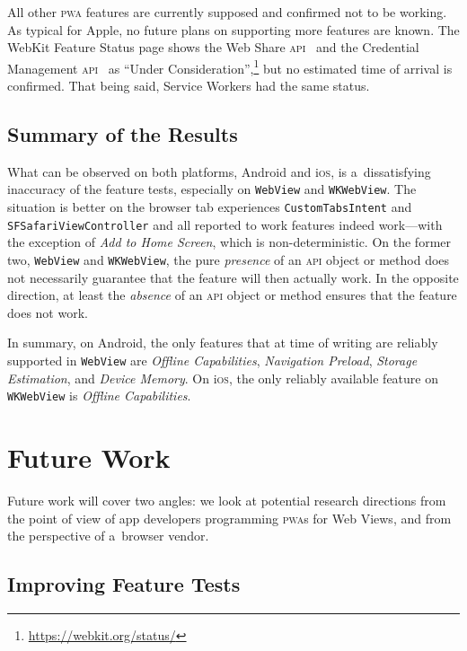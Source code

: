 \documentclass[sigconf]{acmart}
\begin{document}
All other \textsc{pwa} features are currently supposed and confirmed not to be working.
As typical for Apple, no future plans on supporting more features are known.
The WebKit Feature Status page shows the Web Share \textsc{api}~\cite{giuca2017webshare}
and the Credential Management \textsc{api}~\cite{west2017credentialmanagement}
as ``Under Consideration'',\footnote{\url{https://webkit.org/status/}}
but no estimated time of arrival is confirmed.
That being said, Service Workers had the same status.

\subsection{Summary of the Results}

What can be observed on both platforms, Android and i\textsc{os},
is a~dissatisfying inaccuracy of the feature tests,
especially on \texttt{WebView} and \texttt{WKWebView}.
The situation is better on the browser tab experiences
\texttt{CustomTabsIntent} and \texttt{SFSafariViewController}
and all reported to work features indeed work---with
the exception of \emph{Add to Home Screen}, which is non-deterministic.
On the former two, \texttt{WebView} and \texttt{WKWebView},
the pure \emph{presence} of an \textsc{api} object or method
does not necessarily guarantee that the feature will then actually work.
In the opposite direction, at least the \emph{absence}
of an \textsc{api} object or method ensures that the feature does not work.

In summary, on Android, the only features that at time of writing
are reliably supported in \texttt{WebView}
are \emph{Offline Capabilities}, \emph{Navigation Preload}, \emph{Storage Estimation},
and \emph{Device Memory}.
On i\textsc{os}, the only reliably available feature on \texttt{WKWebView}
is \emph{Offline Capabilities}.

\section{Future Work}
\label{sec:future-work}

Future work will cover two angles:
we look at potential research directions from the point of view of app developers
programming \textsc{pwa}s for Web Views,
and from the perspective of a~browser vendor.

\subsection{Improving Feature Tests}
\end{document}
